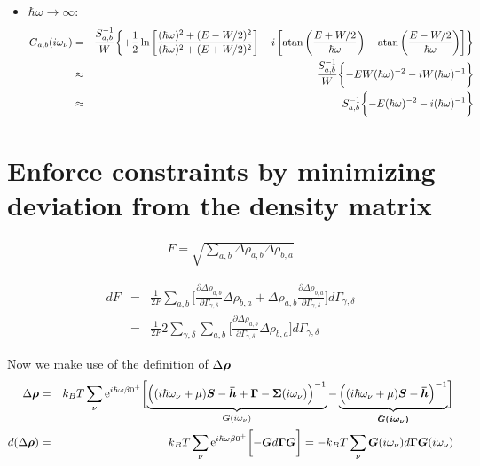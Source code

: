 \documentclass[11pt,a4paper]{report}
\begin{document}
\begin{itemize}
%
\item $\hbar\omega\rightarrow \infty$:
\begin{eqnarray}
G_{a,b}(i\omega_\nu)&=&
\frac{S^{-1}_{a,b}}{W}
\biggl\lbrace
+\frac{1}{2}\ln\left[
\frac{(\hbar\omega)^2+(E-W/2)^2}{(\hbar\omega)^2+(E+W/2)^2}
\right]
-i \left[\atan\left(\frac{E+W/2}{\hbar\omega}\right)
-\atan\left(\frac{E-W/2}{\hbar\omega}\right)\right]
\biggr\rbrace
\nonumber\\
%
&\approx&
\frac{S^{-1}_{a,b}}{W}
\biggl\lbrace
-EW(\hbar\omega)^{-2}
-i W (\hbar\omega)^{-1}
\biggr\rbrace
%
\nonumber\\
&\approx&
S^{-1}_{a,b}
\biggl\lbrace
-E(\hbar\omega)^{-2}
-i  (\hbar\omega)^{-1}
\biggr\rbrace
\end{eqnarray}
\end{itemize}

\newpage
\section{Enforce constraints by minimizing deviation from the density matrix}

\begin{eqnarray}
F=\sqrt{\sum_{a,b} \Delta\rho_{a,b}\Delta\rho_{b,a}}
\end{eqnarray}

\begin{eqnarray}
dF&=&\frac{1}{2F}\sum_{a,b} 
\biggl[\frac{\partial\Delta\rho_{a,b}}{\partial\Gamma_{\gamma,\delta}}
       \Delta\rho_{b,a}
+\Delta\rho_{a,b}\frac{\partial\Delta\rho_{b,a}}{\partial\Gamma_{\gamma,\delta}}
       \biggr]d\Gamma_{\gamma,\delta}
\nonumber\\
&=&\frac{1}{2F}2\sum_{\gamma,\delta}\sum_{a,b} 
\biggl[\frac{\partial\Delta\rho_{a,b}}{\partial\Gamma_{\gamma,\delta}}
 \Delta\rho_{b,a}
       \biggr]d\Gamma_{\gamma,\delta}
\end{eqnarray}

Now we make use of the definition of $\Delta\bm{\rho}$
\begin{eqnarray}
\Delta\bm{\rho}
&=&k_BT\sum_\nu\mathrm{e}^{i\hbar\omega\beta0^+}
\biggl[
\underbrace{\Bigl((i\hbar\omega_\nu+\mu)\bm{S}-\bm{\bar{h}}
+\bm{\Gamma}-\bm{\Sigma}(i\omega_\nu)\Bigr)^{-1}}_{\bm{G}(i\omega_\nu)}
-\underbrace{\Bigl((i\hbar\omega_\nu+\mu)\bm{S}-\bm{\bar{h}}
\Bigr)^{-1}}_{\bm{\bar{{G}}(i\omega_\nu)}}\biggr]
\nonumber\\
d(\Delta\bm{\rho})
&=&
k_BT\sum_\nu\mathrm{e}^{i\hbar\omega\beta0^+}
\biggl[-\bm{G}d\bm{\Gamma}\bm{G}\biggr]
=-
k_BT\sum_\nu\bm{G}(i\omega_\nu)d\bm{\Gamma}
\bm{G}(i\omega_\nu)
\end{eqnarray}
\end{document}
